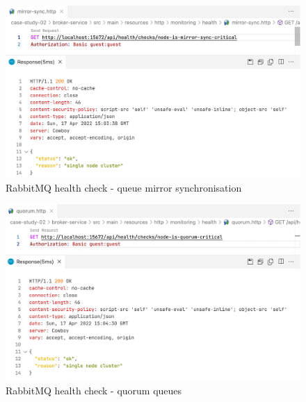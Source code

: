 \begin{figure}[H]
	\centering
	\includegraphics[width=1.0\linewidth]{./assets/images/case-studies/cs02-hc7.png}
	\caption{RabbitMQ health check - queue mirror synchronisation}
	\label{fig:cs02-hc7}
\end{figure}


\begin{figure}[H]
	\centering
	\includegraphics[width=1.0\linewidth]{./assets/images/case-studies/cs02-hc8.png}
	\caption{RabbitMQ health check - quorum queues}
	\label{fig:cs02-hc8}
\end{figure}



